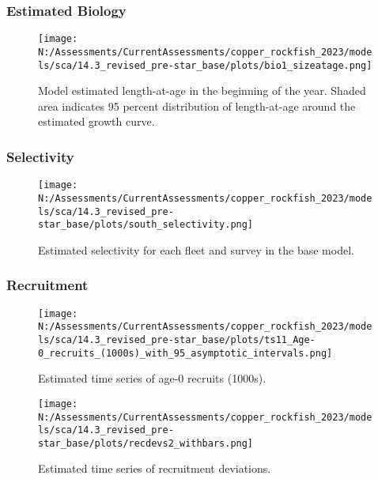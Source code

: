 \documentclass[11pt,
  english,
  letterpaper,
]{article}
\begin{document}
\hypertarget{estimated-biology}{%
\subsubsection{Estimated Biology}\label{estimated-biology}}

\begin{figure}
\centering
\texttt{[image: N:/Assessments/CurrentAssessments/copper\_rockfish\_2023/models/sca/14.3\_revised\_pre-star\_base/plots/bio1\_sizeatage.png]}
\caption{Model estimated length-at-age in the beginning of the year. Shaded area indicates 95 percent distribution of length-at-age around the estimated growth curve.\label{fig:mod-est-len-age}}
\end{figure}

\pagebreak

\hypertarget{selectivity}{%
\subsubsection{Selectivity}\label{selectivity}}

\begin{figure}
\centering
\texttt{[image: N:/Assessments/CurrentAssessments/copper\_rockfish\_2023/models/sca/14.3\_revised\_pre-star\_base/plots/south\_selectivity.png]}
\caption{Estimated selectivity for each fleet and survey in the base model.\label{fig:est-selex}}
\end{figure}

\newpage

\hypertarget{recruitment-1}{%
\subsubsection{Recruitment}\label{recruitment-1}}

\begin{figure}
\centering
\texttt{[image: N:/Assessments/CurrentAssessments/copper\_rockfish\_2023/models/sca/14.3\_revised\_pre-star\_base/plots/ts11\_Age-0\_recruits\_(1000s)\_with\_95\_asymptotic\_intervals.png]}
\caption{Estimated time series of age-0 recruits (1000s).\label{fig:recruits}}
\end{figure}

\pagebreak

\begin{figure}
\centering
\texttt{[image: N:/Assessments/CurrentAssessments/copper\_rockfish\_2023/models/sca/14.3\_revised\_pre-star\_base/plots/recdevs2\_withbars.png]}
\caption{Estimated time series of recruitment deviations.\label{fig:rec-devs}}
\end{figure}
\end{document}
